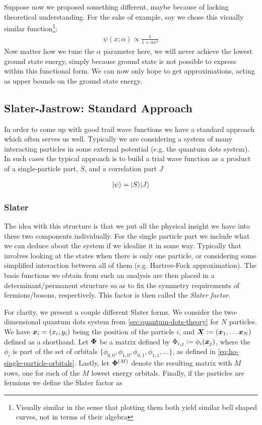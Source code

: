 \documentclass[Thesis.tex]{subfiles}
\begin{document}
Suppose now we proposed something different, maybe because of lacking theoretical
understanding. For the sake of example, say we chose this visually similar
function\footnote{Visually similar in the sense that plotting them both yield similar bell
shaped curves, not in terms of their algebra}:
\begin{align}
    \psi(x; \alpha)\propto \frac{1}{1 + \alpha x^2} 
\end{align}
Now matter how we tune the $\alpha$ parameter here, we will never achieve the lowest
ground state energy, simply because ground state is not possible to express within this
functional form. We can now only hope to get approximations, acting as upper bounds on the
ground state energy.

\subsection{Slater-Jastrow: Standard Approach}

In order to come up with good trail wave functions we have a standard approach which often
serves us well. Typically we are considering a system of many interacting particles in
some external potential (e.g. the quantum dots system). In such cases the typical approach
is to build a trial wave function as a product of a single-particle part, $S$, and a correlation
part $J$

\begin{align}
    | \psi \rangle = | S \rangle | J \rangle
\end{align}

\subsubsection*{Slater}

The idea with this structure is that we put all the physical insight we have into these
two components individually. For the single particle part we include what we can deduce
about the system if we idealize it in some way. Typically that involves looking at the
states when there is only one particle, or considering some simplified interaction between
all of them (e.g. Hartree-Fock approximation). The basis functions we obtain from such an
analysis are then placed in a determinant/permanent structure so as to fix the symmetry
requirements of fermions/bosons, respectively. This factor is then called the \emph{Slater
factor}. 


For clarity, we present a couple different Slater forms. We consider the two-dimensional
quantum dots system from \autoref{sec:quantum-dots-theory} for $N$ particles.  We have
$\bm{x}_i=(x_i, y_i)$ being the position of the particle $i$, and $\vb X\defeq (\vb x_1,
\dots \vb x_N)$ defined as a shorthand. Let $\bm{\Phi}$ be a matrix defined by $\Phi_{i,j}
\vcentcolon= \phi_{i}(\bm{x}_j)$, where the $\phi_i$ is part of the set of orbitals
$\{\phi_{0,0}, \phi_{1,0},\phi_{0,1}, \phi_{1,1},\dots\}$, as defined in
\autoref{eq:ho-single-particle-orbitals}. Lastly, let $\bm{\Phi}^{(M)}$ denote the
resulting matrix with $M$ rows, one for each of the $M$ lowest energy orbitals. Finally,
if the particles are fermions we define the Slater factor as
\end{document}

